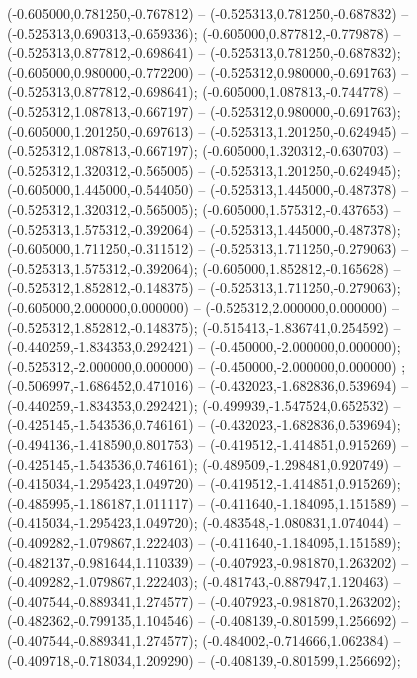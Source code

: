 (-0.605000,0.781250,-0.767812) -- (-0.525313,0.781250,-0.687832) -- (-0.525313,0.690313,-0.659336);
 (-0.605000,0.877812,-0.779878) -- (-0.525313,0.877812,-0.698641) -- (-0.525313,0.781250,-0.687832);
 (-0.605000,0.980000,-0.772200) -- (-0.525312,0.980000,-0.691763) -- (-0.525313,0.877812,-0.698641);
 (-0.605000,1.087813,-0.744778) -- (-0.525312,1.087813,-0.667197) -- (-0.525312,0.980000,-0.691763);
 (-0.605000,1.201250,-0.697613) -- (-0.525313,1.201250,-0.624945) -- (-0.525312,1.087813,-0.667197);
 (-0.605000,1.320312,-0.630703) -- (-0.525312,1.320312,-0.565005) -- (-0.525313,1.201250,-0.624945);
 (-0.605000,1.445000,-0.544050) -- (-0.525313,1.445000,-0.487378) -- (-0.525312,1.320312,-0.565005);
 (-0.605000,1.575312,-0.437653) -- (-0.525313,1.575312,-0.392064) -- (-0.525313,1.445000,-0.487378);
 (-0.605000,1.711250,-0.311512) -- (-0.525313,1.711250,-0.279063) -- (-0.525313,1.575312,-0.392064);
 (-0.605000,1.852812,-0.165628) -- (-0.525312,1.852812,-0.148375) -- (-0.525313,1.711250,-0.279063);
 (-0.605000,2.000000,0.000000) -- (-0.525312,2.000000,0.000000) -- (-0.525312,1.852812,-0.148375);
 (-0.515413,-1.836741,0.254592) -- (-0.440259,-1.834353,0.292421) -- (-0.450000,-2.000000,0.000000);
 (-0.525312,-2.000000,0.000000) -- (-0.450000,-2.000000,0.000000) ;
 (-0.506997,-1.686452,0.471016) -- (-0.432023,-1.682836,0.539694) -- (-0.440259,-1.834353,0.292421);
 (-0.499939,-1.547524,0.652532) -- (-0.425145,-1.543536,0.746161) -- (-0.432023,-1.682836,0.539694);
 (-0.494136,-1.418590,0.801753) -- (-0.419512,-1.414851,0.915269) -- (-0.425145,-1.543536,0.746161);
 (-0.489509,-1.298481,0.920749) -- (-0.415034,-1.295423,1.049720) -- (-0.419512,-1.414851,0.915269);
 (-0.485995,-1.186187,1.011117) -- (-0.411640,-1.184095,1.151589) -- (-0.415034,-1.295423,1.049720);
 (-0.483548,-1.080831,1.074044) -- (-0.409282,-1.079867,1.222403) -- (-0.411640,-1.184095,1.151589);
 (-0.482137,-0.981644,1.110339) -- (-0.407923,-0.981870,1.263202) -- (-0.409282,-1.079867,1.222403);
 (-0.481743,-0.887947,1.120463) -- (-0.407544,-0.889341,1.274577) -- (-0.407923,-0.981870,1.263202);
 (-0.482362,-0.799135,1.104546) -- (-0.408139,-0.801599,1.256692) -- (-0.407544,-0.889341,1.274577);
 (-0.484002,-0.714666,1.062384) -- (-0.409718,-0.718034,1.209290) -- (-0.408139,-0.801599,1.256692);
